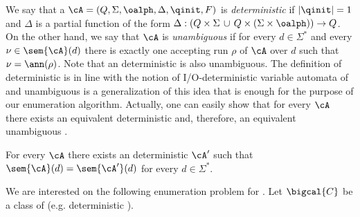 	
	We say that a \rt $\cA = (Q, \Sigma, \oalph, \Delta, \qinit, F)$ is %
	{\it deterministic} if $|\qinit| = 1$ and $\Delta$ is a partial function of the form $\Delta: (Q \times \Sigma \, \cup\, Q\times (\Sigma\times\oalph)) \to Q$.
	On the other hand, we say that $\cA$ is 
	{\it unambiguous} if for every $d\in \Sigma^*$ and every $\nu \in \sem{\cA}(d)$ there is exactly one accepting run $\rho$ of $\cA$ over $d$ such that $\nu = \ann(\rho)$. 
	Note that an 
	deterministic \rt is also 
	unambiguous. The definition of deterministic is in line with the notion of I/O-deterministic variable automata of~\cite{FlorenzanoRUVV20} and unambiguous is a generalization of this idea that is enough for the purpose of our enumeration algorithm. Actually, one can easily show that for every \rt $\cA$ there exists an equivalent deterministic \rt and, therefore, an equivalent unambiguous \rt. 
	\begin{lemma}\label{slps:ra:det}
		For every \rtname $\cA$ there exists an deterministic \rtname $\cA'$ such that $\sem{\cA}(d) = \sem{\cA'}(d)$ for every $d\in\Sigma^*$.
	\end{lemma}
	
	We are interested on the following enumeration problem for \rts. Let $\bigcal{C}$ be a class of \rt (e.g. deterministic \rt). 
	
	\begin{center}
	\end{center}

